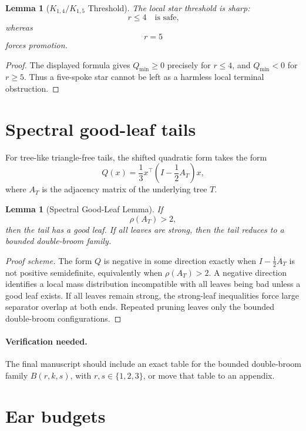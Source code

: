 \documentclass[11pt]{article}
\newtheorem{lemma}[theorem]{Lemma}
\theoremstyle{definition}
\begin{document}
\begin{lemma}[\(K_{1,4}/K_{1,5}\) Threshold]\label{lem:k14-k15}
The local star threshold is sharp:
\[
    r\le4
    \quad\text{is safe,}
\]
whereas
\[
    r=5
\]
forces promotion.
\end{lemma}

\begin{proof}
The displayed formula gives \(Q_{\min}\ge0\) precisely for \(r\le4\), and \(Q_{\min}<0\) for \(r\ge5\). Thus a five-spoke star cannot be left as a harmless local terminal obstruction.
\end{proof}

\section{Spectral good-leaf tails}

For tree-like triangle-free tails, the shifted quadratic form takes the form
\[
    Q(x)=
    \frac13x^\top
    \left(I-\frac12A_T\right)x,
\]
where \(A_T\) is the adjacency matrix of the underlying tree \(T\).

\begin{lemma}[Spectral Good-Leaf Lemma]\label{lem:spectral-good-leaf}
If
\[
    \rho(A_T)>2,
\]
then the tail has a good leaf. If all leaves are strong, then the tail reduces to a bounded double-broom family.
\end{lemma}

\begin{proof}[Proof scheme]
The form \(Q\) is negative in some direction exactly when \(I-\frac12A_T\) is not positive semidefinite, equivalently when \(\rho(A_T)>2\). A negative direction identifies a local mass distribution incompatible with all leaves being bad unless a good leaf exists. If all leaves remain strong, the strong-leaf inequalities force large separator overlap at both ends. Repeated pruning leaves only the bounded double-broom configurations.
\end{proof}

\paragraph{Verification needed.}
The final manuscript should include an exact table for the bounded double-broom family \(B(r,k,s)\), with \(r,s\in\{1,2,3\}\), or move that table to an appendix.


\section{Ear budgets}
\end{document}
